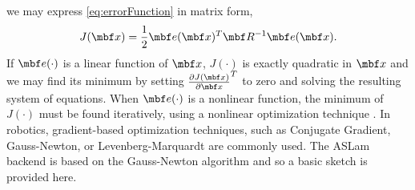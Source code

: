 \documentclass[11pt,a4,oneside]{article}
\begin{document}
we may express \eqref{eq:errorFunction} in matrix form,
\begin{equation}
  \label{eq:errorFunctionMatrix}
   J(\mbf x) = \frac{1}{2}\mbf e(\mbf x)^T \mbf R^{-1} \mbf e(\mbf x).
\end{equation}
If $\mbf e(\cdot)$ is a linear function of $\mbf x$, $J(\cdot)$ is exactly quadratic in $\mbf x$ and we may find its minimum by setting $\pd{J(\mbf x)}{\mbf x}^T$ to zero and solving the resulting system of equations. When $\mbf e(\cdot)$ is a nonlinear function, the minimum of $J(\cdot)$ must be found iteratively, using a nonlinear optimization technique \citep{nocedal06}. In robotics, gradient-based optimization techniques, such as Conjugate Gradient, Gauss-Newton, or Levenberg-Marquardt are commonly used. The ASLam backend is based on the Gauss-Newton algorithm and so a basic sketch is provided here.
\end{document}
